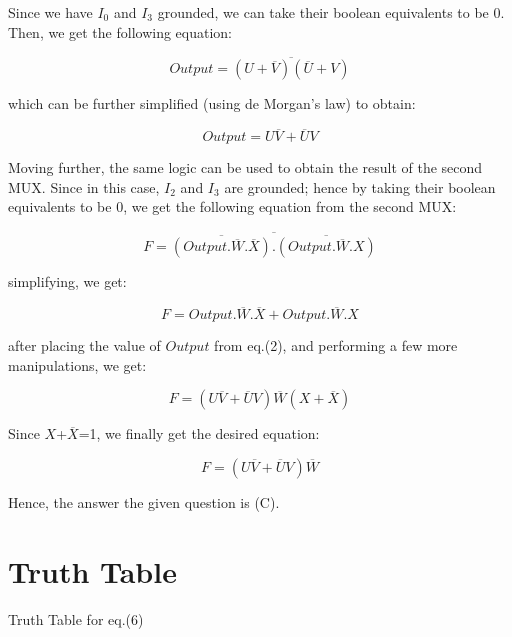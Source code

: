 \documentclass{article}
\begin{document}
Since we have $I_0$ and $I_3$ grounded, we can take their boolean equivalents to be 0. Then, we get the following equation:

\begin{equation}
    Output = \overline{ (U + \overline{V}) (\overline{U} + V) }
\end{equation}

which can be further simplified (using de Morgan's law) to obtain:

\begin{equation}
    Output = U \overline{V} + \overline{U} V
\end{equation}

\hspace{0.5cm}

Moving further, the same logic can be used to obtain the result of the second MUX. Since in this case, $I_2$ and $I_3$ are grounded; hence by taking their boolean equivalents to be 0, we get the following equation from the second MUX:

\begin{equation}
    F = \overline{ \overline{(Output. \overline{W}. \overline{X})}. \overline{(Output. \overline{W}. X )}}
\end{equation}

simplifying, we get:

\begin{equation}
    F = Output.\overline{W}.\overline{X} + Output.\overline{W}.X
\end{equation}

after placing the value of $Output$ from eq.(2), and performing a few more manipulations, we get:

\begin{equation}
    F = (U\overline{V}+\overline{U}V)\overline{W}(X+\overline{X})
\end{equation}

\hspace{0.5cm}

Since $X$+$\overline{X}$=1, we finally get the desired equation:

\begin{equation}
    F = (U\overline{V}+\overline{U}V)\overline{W}
\end{equation}

Hence, the answer the given question is (C).

\vspace{5cm}
\pagebreak{}

\section{Truth Table}
\begin{table}[!ht]
\centering
\resizebox{\columnwidth}{!} {

}
\caption{Truth Table for eq.(6)}
\label{table1}
\end{table}
\end{document}
